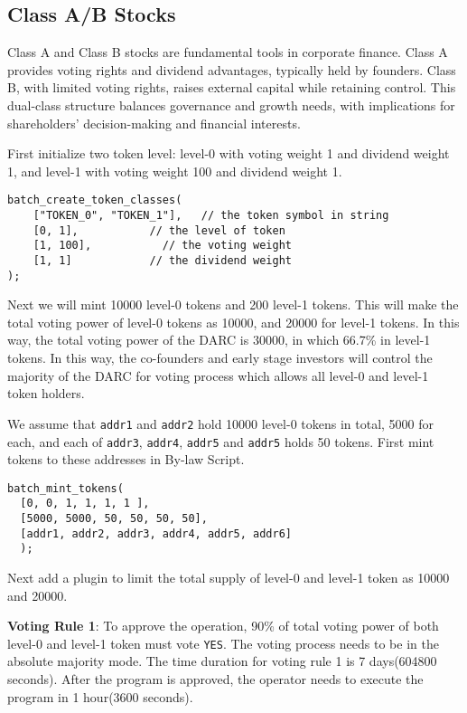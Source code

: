 \documentclass[main.tex]{subfiles}
\begin{document}
\subsection{Class A/B Stocks}

Class A and Class B stocks are fundamental tools in corporate finance. Class A provides voting rights and dividend advantages, typically held by founders. Class B, with limited voting rights, raises external capital while retaining control. This dual-class structure balances governance and growth needs, with implications for shareholders' decision-making and financial interests.

First initialize two token level: level-0 with voting weight 1 and dividend weight 1, and level-1 with voting weight 100 and dividend weight 1.

\begin{verbatim}
batch_create_token_classes(
    ["TOKEN_0", "TOKEN_1"],   // the token symbol in string
    [0, 1],           // the level of token
    [1, 100],           // the voting weight
    [1, 1]            // the dividend weight
);
\end{verbatim}

Next we will mint 10000 level-0 tokens and 200 level-1 tokens. This will make the total voting power of level-0 tokens as 10000, and 20000 for level-1 tokens. In this way, the total voting power of the DARC is 30000, in which 66.7\% in level-1 tokens. In this way, the co-founders and early stage investors will control the majority of the DARC for voting process which allows all level-0 and level-1 token holders.

We assume that \texttt{addr1} and \texttt{addr2} hold 10000 level-0 tokens in total, 5000 for each, and each of \texttt{addr3}, \texttt{addr4}, \texttt{addr5} and \texttt{addr5} holds 50 tokens. First mint tokens to these addresses in By-law Script.

\begin{verbatim}
batch_mint_tokens(
  [0, 0, 1, 1, 1, 1 ], 
  [5000, 5000, 50, 50, 50, 50], 
  [addr1, addr2, addr3, addr4, addr5, addr6]
  );
\end{verbatim}

Next add a plugin to limit the total supply of level-0 and level-1 token as 10000 and 20000. 

\textbf{Voting Rule 1}: To approve the operation, 90\% of total voting power of both level-0 and level-1 token must vote \texttt{YES}. The voting process needs to be in the absolute majority mode. The time duration for voting rule 1 is 7 days(604800 seconds). After the program is approved, the operator needs to execute the program in 1 hour(3600 seconds).
\end{document}
